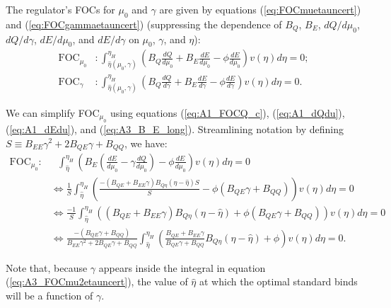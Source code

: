 \documentclass[12pt]{article}
\begin{document}
The regulator's FOCs for $\mu_0$ and $\gamma$ are given by equations (\ref{eq:FOCmuetauncert}) and (\ref{eq:FOCgammaetauncert}) (suppressing the dependence of $B_Q$, $B_E$, $dQ/d\mu_0$, $dQ/d\gamma$, $dE/d\mu_0$, and $dE/d\gamma$ on $\mu_0$, $\gamma$, and $\eta$):
\begin{align}
\text{FOC}_{\mu_0}&:\int_{\hat{\eta}(\mu_0,\gamma)}^{\eta_H}\left(B_Q\frac{dQ}{d\mu_0} +B_E\frac{dE}{d\mu_0} -\phi\frac{dE}{d\mu_0}\right)v(\eta)d\eta = 0; \label{eq:FOCmuetauncert} \\
\text{FOC}_{\gamma}&:\int_{\hat{\eta}(\mu_0,\gamma)}^{\eta_H}\left(B_Q\frac{dQ}{d\gamma} +B_E\frac{dE}{d\gamma} -\phi\frac{dE}{d\gamma}\right)v(\eta)d\eta = 0. \label{eq:FOCgammaetauncert}
\end{align}

We can simplify FOC$_{\mu_0}$ using equations (\ref{eq:A1_FOCQ_c}), (\ref{eq:A1_dQdu}), (\ref{eq:A1_dEdu}), and (\ref{eq:A3_B_E_long}). Streamlining notation by defining $S\equiv B_{EE}\gamma^2+2B_{QE}\gamma+B_{QQ}$, we have:
\begin{align}
\text{FOC}_{\mu_0}:& \text{ } \int_{\hat{\eta}}^{\eta_H}\left(B_E(\frac{dE}{d\mu_0}-\gamma\frac{dQ}{d\mu_0}) -\phi\frac{dE}{d\mu_0}\right)v(\eta)d\eta = 0 \\
&\Leftrightarrow \frac{1}{S}\int_{\hat{\eta}}^{\eta_H}\left(\frac{-(B_{QE}+B_{EE}\gamma)B_{Q\eta}(\eta-\hat{\eta})S}{S} - \phi(B_{QE}\gamma+B_{QQ})\right)v(\eta)d\eta = 0 \\
&\Leftrightarrow \frac{-1}{S}\int_{\hat{\eta}}^{\eta_H}\left((B_{QE}+B_{EE}\gamma)B_{Q\eta}(\eta-\hat{\eta}) + \phi(B_{QE}\gamma+B_{QQ})\right)v(\eta)d\eta = 0 \label{eq:A3_FOCmu2etauncert_int} \\
&\Leftrightarrow \frac{-(B_{QE}\gamma+B_{QQ})}{B_{EE}\gamma^2+2B_{QE}\gamma+B_{QQ}} \int_{\hat{\eta}}^{\eta_H}\left(\frac{B_{QE}+B_{EE}\gamma}{B_{QE}\gamma+B_{QQ}} B_{Q\eta}(\eta-\hat{\eta})+\phi\right)v(\eta)d\eta = 0. \label{eq:A3_FOCmu2etauncert}
\end{align}

Note that, because $\gamma$ appears inside the integral in equation (\ref{eq:A3_FOCmu2etauncert}), the value of $\hat{\eta}$ at which the optimal standard binds will be a function of $\gamma$.
\end{document}
